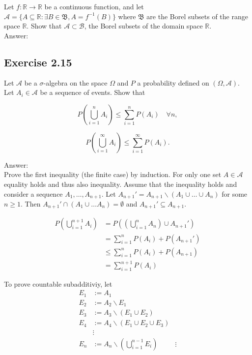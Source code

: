 \documentclass{article}
\begin{document}
Let $f: \mathbb{R} \rightarrow \mathbb{R}$ be a continuous function, and let $\mathcal{A} = \{A \subseteq \mathbb{R} : \exists B \in \mathfrak{B}, A = f^{-1}(B)\}$ where $\mathfrak{B}$ are the Borel subsets of the range space $\mathbb{R}$. Show that $\mathcal{A}\subset \mathcal{B}$, the Borel subsets of the domain space $\mathbb{R}$. \\

Answer: \\

\subsection*{Exercise 2.15}

Let $\mathcal{A}$ be a $\sigma$-algebra on the space $\Omega$ and $P$ a probability defined on $(\Omega, \mathcal{A})$. Let $A_i \in \mathcal{A}$ be a sequence of events. Show that

$$
P\left(\bigcup_{i=1}^n A_i \right) \leq \sum_{i = 1}^n P(A_i) \quad \forall n,
$$

$$
P\left(\bigcup_{i=1}^\infty A_i \right) \leq \sum_{i = 1}^\infty P(A_i).
$$

Answer:\\

Prove the first inequality (the finite case) by induction. For only one set $A \in \mathcal{A}$ equality holds and thus also inequality. Assume that the inequality holds and consider a sequence $A_1, \dots , A_{n+1}$. Let $A_{n+1}' = A_{n+1} \backslash (A_1 \cup \dots \cup A_{n})$ for some $n \geq 1$. Then $A_{n+1}' \cap (A_1 \cup \dots A_n) = \emptyset$ and $A_{n+1}' \subseteq A_{n+1}$.

\begin{align*}
P\left(\bigcup_{i=1}^{n+1} A_i \right)
&= P\left(\left(\bigcup_{i=1}^n A_n \right) \cup A_{n+1}' \right) \\
&= \sum_{i = 1}^n P(A_i) + P(A_{n+1}') \\
&\leq \sum_{i = 1}^n P(A_i) + P(A_{n+1}) \\
&= \sum_{i = 1}^{n+1} P(A_i)
\end{align*}

To prove countable subadditiviy, let
\begin{align*}
E_1 &:= A_1 \\
E_2 &:= A_2 \backslash  E_1 \\
E_3 &:= A_3 \backslash (E_1 \cup E_2) \\
E_4 &:= A_4 \backslash (E_1 \cup E_2 \cup E_3) \\
&\vdots \\
E_n &:= A_n \backslash \left(\bigcup_{i=1}^{n-1} E_i \right)
&\vdots 
\end{align*}
\end{document}
